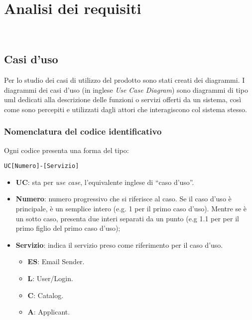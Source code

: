 
\chapter{Analisi dei requisiti}
\label{cap:analisi-requisiti}

\\ %

\section{Casi d'uso}

Per lo studio dei casi di utilizzo del prodotto sono stati creati dei diagrammi.
I diagrammi dei casi d'uso (in inglese \emph{Use Case Diagram}) sono diagrammi di tipo \gls{uml} dedicati alla descrizione delle funzioni o servizi offerti da un sistema, così come sono percepiti e utilizzati dagli attori che interagiscono col sistema stesso.

\subsection{Nomenclatura del codice identificativo}

Ogni codice presenta una forma del tipo:

\begin{center}
	\texttt{UC[Numero]-[Servizio]}
\end{center}

\begin{itemize}
	\item \textbf{UC}: sta per \textit{use case}, l'equivalente inglese di ``caso d'uso''.
	\item \textbf{Numero}: numero progressivo che si riferisce al caso. Se il caso d'uso è principale, è un semplice intero (e.g. 1 per il primo caso d'uso). Mentre se è un sotto caso, presenta due interi separati da un punto (e.g 1.1 per per il primo figlio del primo caso d'uso);
	\item \textbf{Servizio}: indica il servizio preso come riferimento per il caso d'uso.
	\begin{itemize}
		\item \textbf{ES}: Email Sender.
		\item \textbf{L}: User/Login.
		\item \textbf{C}: Catalog.
		\item \textbf{A}: Applicant.
	\end{itemize}
\end{itemize}

